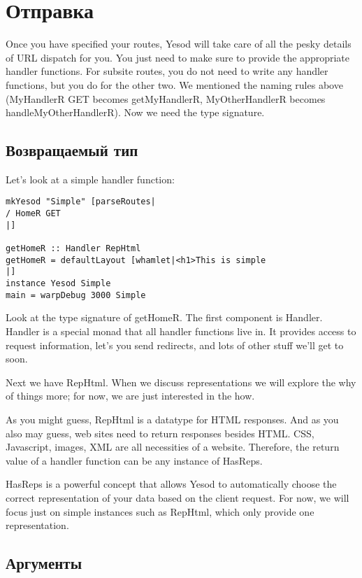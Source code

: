 \section{Отправка}
Once you have specified your routes, Yesod will take care of all the
pesky details of URL dispatch for you. You just need to make sure to
provide the appropriate handler functions. For subsite routes, you do
not need to write any handler functions, but you do for the other
two. We mentioned the naming rules above (MyHandlerR GET becomes
getMyHandlerR, MyOtherHandlerR becomes handleMyOtherHandlerR). Now we
need the type signature.

\subsection{Возвращаемый тип}

Let's look at a simple handler function:

\begin{lstlisting}
mkYesod "Simple" [parseRoutes|
/ HomeR GET
|]

getHomeR :: Handler RepHtml
getHomeR = defaultLayout [whamlet|<h1>This is simple
|]
instance Yesod Simple
main = warpDebug 3000 Simple
\end{lstlisting}

Look at the type signature of getHomeR. The first component is
Handler. Handler is a special monad that all handler functions live
in. It provides access to request information, let's you send
redirects, and lots of other stuff we'll get to soon.

Next we have RepHtml. When we discuss representations we will explore
the why of things more; for now, we are just interested in the how.

As you might guess, RepHtml is a datatype for HTML responses. And as
you also may guess, web sites need to return responses besides
HTML. CSS, Javascript, images, XML are all necessities of a
website. Therefore, the return value of a handler function can be any
instance of HasReps.

HasReps is a powerful concept that allows Yesod to automatically
choose the correct representation of your data based on the client
request. For now, we will focus just on simple instances such as
RepHtml, which only provide one representation.

\subsection{Аргументы}

